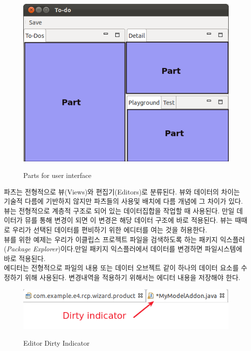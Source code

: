 \begin{figure}[hbt]
\centering
\includegraphics[scale=.50]{./image/e4_004}
\label{fig:4}       %
\captionsetup{justification=centering}
\caption{Parts for user interface}
\end{figure}

파츠는 전형적으로 뷰(Views)와 편집기(Editors)로 분류된다. 뷰와 데이터의 차이는 기술적 다름에 기반하지 않지만 파츠들의 사용및 배치에 다름 개념에 그 차이가 있다. \\

뷰는 전형적으로 계층적 구조로 되어 있는 데이터집합을 작업할 때 사용된다. 만일 데이터가 뮤를 통해 변경이 되면 이 변경은 해당 데이터 구조에 바로 적용된다. 뷰는 때때로 우리가 선택된 데이터를 편비하기 위한 에디터를 여는 것을 허용한다. \\

뷰를 위한 예제는 우리가 이클립스 프로젝트 파일을 검색하도록 하는 패키지 익스플러(\textit{Package Explorer})이다.만일 패키지 익스플러에서 데이터를 변경하면 파일시스템에 바로 적용된다. \\

에디터는 전형적으로 파일의 내용 또는 데이터 오브젝트 같이 하나의 데이터 요소를 수정하기 위해 사용된다. 변경내역을 적용하기 위해서는 에디터 내용을 저장해야 한다. \\

\begin{figure}[hbt]
\centering
\includegraphics[scale=.50]{./image/e4_005}
\label{fig:5}       %
\captionsetup{justification=centering}
\caption{Editor Dirty Indicator}
\end{figure}

